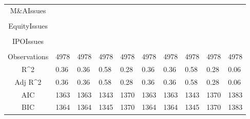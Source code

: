 \documentclass{article}
\begin{document}
\begin{table}[H]
\begin{tabular}{|clllllllll|}
  M\&AIssues &  &  &  &  &  &  &  &  &  \\ 
   &  &  &  &  &  &  &  &  &  \\ 
  EquityIssues &  &  &  &  &  &  &  &  &  \\ 
   &  &  &  &  &  &  &  &  &  \\ 
  IPOIssues &  &  &  &  &  &  &  &  &  \\ 
   &  &  &  &  &  &  &  &  &  \\ 
  \hline 
 Observations & 4978 & 4978 & 4978 & 4978 & 4978 & 4978 & 4978 & 4978 & 4978 \\ 
  R^2 & 0.36 & 0.36 & 0.58 & 0.28 & 0.36 & 0.36 & 0.58 & 0.28 & 0.06 \\ 
  Adj R^2 & 0.36 & 0.36 & 0.58 & 0.28 & 0.36 & 0.36 & 0.58 & 0.28 & 0.06 \\ 
  AIC & 1363 & 1363 & 1343 & 1370 & 1363 & 1363 & 1343 & 1370 & 1383 \\ 
  BIC & 1364 & 1364 & 1345 & 1370 & 1364 & 1364 & 1345 & 1370 & 1383 \\ 
   \hline
\end{tabular}
 
\end{table}
\end{document}
